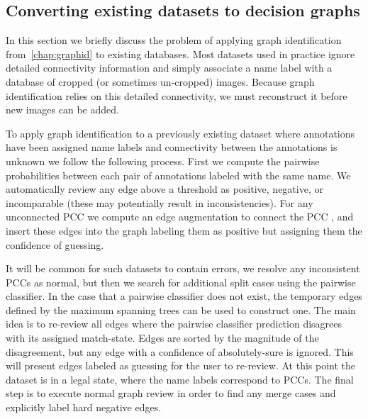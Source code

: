 \begin{appendices}

\chapter{Converting existing datasets to decision graphs}\label{sec:rename}
In this section we briefly discuss the problem of applying graph identification from~\cref{chap:graphid} to
existing databases. Most datasets used in practice ignore detailed connectivity information and simply associate a
name label with a database of cropped (or sometimes un-cropped) images. Because graph identification relies on this
detailed connectivity, we must reconstruct it before new images can be added.

To apply graph identification to a previously existing dataset where annotations have been assigned name labels and
connectivity between the annotations is unknown we follow the following process. First we compute the pairwise
probabilities between each pair of annotations labeled with the same name. We automatically review any edge above a
threshold as positive, negative, or incomparable (these may potentially result in inconsistencies). For any
unconnected PCC we compute an edge augmentation to connect the PCC
\cite{eswaran_augmentation_1976,khuller_approximation_1993}, and insert these edges into the graph labeling them as
positive but assigning them the confidence of guessing.

It will be common for such datasets to contain errors, we resolve any inconsistent PCCs as normal, but then we
search for additional split cases using the pairwise classifier. In the case that a pairwise classifier does not
exist, the temporary edges defined by the maximum spanning trees can be used to construct one. The main idea is to
re-review all edges where the pairwise classifier prediction disagrees with its assigned match-state. Edges are
sorted by the magnitude of the disagreement, but any edge with a confidence of absolutely-sure is ignored. This
will present edges labeled as guessing for the user to re-review. At this point the dataset is in a legal state,
where the name labels correspond to PCCs. The final step is to execute normal graph review in order to find any
merge cases and explicitly label hard negative edges.


\end{appendices}
